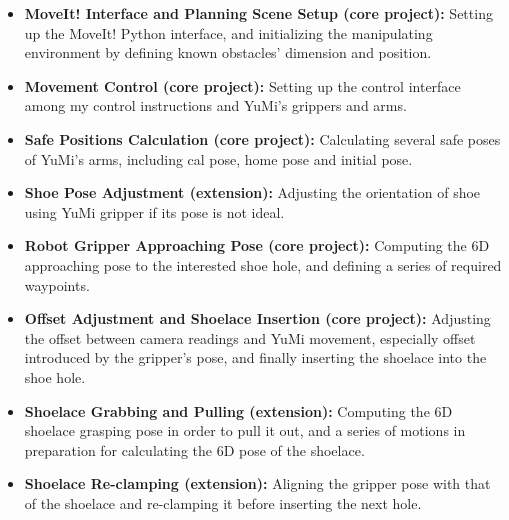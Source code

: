 \begin{itemize}
    \item \textbf{MoveIt! Interface and Planning Scene Setup (core project):} Setting up the MoveIt! Python interface, and initializing the manipulating environment by defining known obstacles' dimension and position.
    \item \textbf{Movement Control (core project):} Setting up the control interface among my control instructions and YuMi's grippers and arms.
    \item \textbf{Safe Positions Calculation (core project):} Calculating several safe poses of YuMi's arms, including cal pose, home pose and initial pose.
    \item \textbf{Shoe Pose Adjustment (extension):} Adjusting the orientation of shoe using YuMi gripper if its pose is not ideal. 
    \item \textbf{Robot Gripper Approaching Pose (core project):} Computing the 6D approaching pose to the interested shoe hole, and defining a series of required waypoints.
    \item \textbf{Offset Adjustment and Shoelace Insertion (core project):} Adjusting the offset between camera readings and YuMi movement, especially offset introduced by the gripper's pose, and finally inserting the shoelace into the shoe hole.
    \item \textbf{Shoelace Grabbing and Pulling (extension):} Computing the 6D shoelace grasping pose in order to pull it out, and a series of motions in preparation for calculating the 6D pose of the shoelace.
    \item \textbf{Shoelace Re-clamping (extension):} Aligning the gripper pose with that of the shoelace and re-clamping it before inserting the next hole.
\end{itemize}



